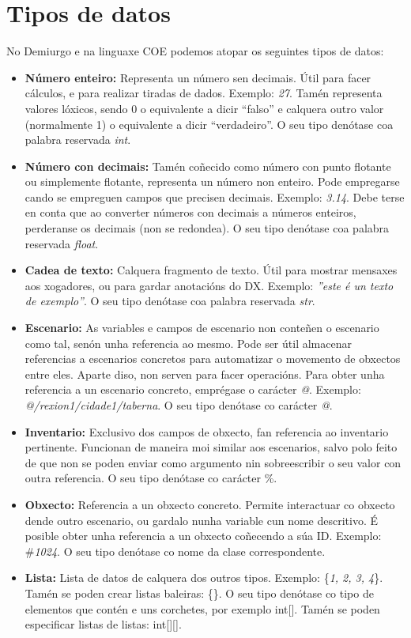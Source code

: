 \section{Tipos de datos}
No Demiurgo e na linguaxe COE podemos atopar os seguintes tipos de datos:
\begin{itemize}
  \item {\bf Número enteiro:} Representa un número sen decimais. Útil para facer
  cálculos, e para realizar tiradas de dados. Exemplo: {\it 27}. Tamén
  representa valores lóxicos, sendo 0 o equivalente a dicir ``falso'' e calquera
  outro valor (normalmente 1) o equivalente a dicir ``verdadeiro''. O seu tipo
  denótase coa palabra reservada {\it int}.
  \item {\bf Número con decimais:} Tamén coñecido como número con punto
  flotante ou simplemente flotante, representa un número non enteiro. Pode
  empregarse cando se empreguen campos que precisen decimais. Exemplo: {\it
  3.14}. Debe terse en conta que ao converter números con decimais a números
  enteiros, perderanse os decimais (non se redondea). O seu tipo
  denótase coa palabra reservada {\it float}.
  \item {\bf Cadea de texto:} Calquera fragmento de texto. Útil para mostrar
  mensaxes aos xogadores, ou para gardar anotacións do DX. Exemplo: {\it ''este
  é un texto de exemplo''}. O seu tipo
  denótase coa palabra reservada {\it str}.
  \item {\bf Escenario:} As variables e campos de escenario non conteñen o
  escenario como tal, senón unha referencia ao mesmo. Pode ser útil almacenar
  referencias a escenarios concretos para automatizar o movemento de obxectos
  entre eles. Aparte diso, non serven para facer operacións. Para obter
  unha referencia a un escenario concreto, emprégase o carácter {\it @}.
  Exemplo: {\it @/rexion1/cidade1/taberna}. O seu tipo
  denótase co carácter {\it @}.
  \item {\bf Inventario:} Exclusivo dos campos de obxecto, fan referencia ao
  inventario pertinente. Funcionan de maneira moi similar aos escenarios, salvo
  polo feito de que non se poden enviar como argumento nin sobreescribir o seu
  valor con outra referencia. O seu tipo
  denótase co carácter \%.
  \item {\bf Obxecto:} Referencia a un obxecto concreto. Permite interactuar co
  obxecto dende outro escenario, ou gardalo nunha variable cun nome descritivo.
  É posible obter unha referencia a un obxecto coñecendo a súa ID. Exemplo:
  \#{\it 1024}. O seu tipo
  denótase co nome da clase correspondente.
  \item {\bf Lista:} Lista de datos de calquera dos outros tipos. Exemplo:
  \{{\it 1, 2, 3, 4}\}. Tamén se poden crear listas baleiras: \{\}. O seu tipo
  denótase co tipo de elementos que contén e uns corchetes, por exemplo int[].
  Tamén se poden especificar listas de listas: int[][].
\end{itemize}


